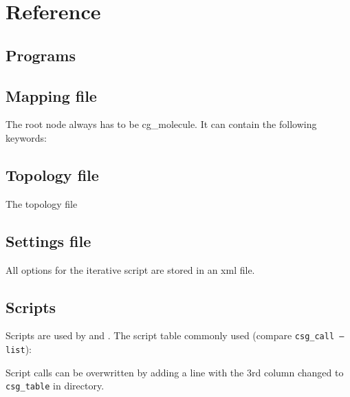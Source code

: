 \chapter{Reference}
\section{Programs}
\label{sec:ref_programs}

\section{Mapping file}
\label{sec:ref_mapping}
The root node always has to be cg\_molecule. It can contain the following keywords:



\section{Topology file}
\label{sec:ref_topology}
The \xml topology file



\section{Settings file}
All options for the iterative script are stored in an xml file.
\label{sec:ref_options}

\vfill

\section{Scripts}
\label{sec:csg_table}
Scripts are used by  and .
The script table commonly used (compare \texttt{csg\_call --list}): 

Script calls can be overwritten by adding a line with the 3rd column changed to \texttt{csg\_table} in  directory.
%
